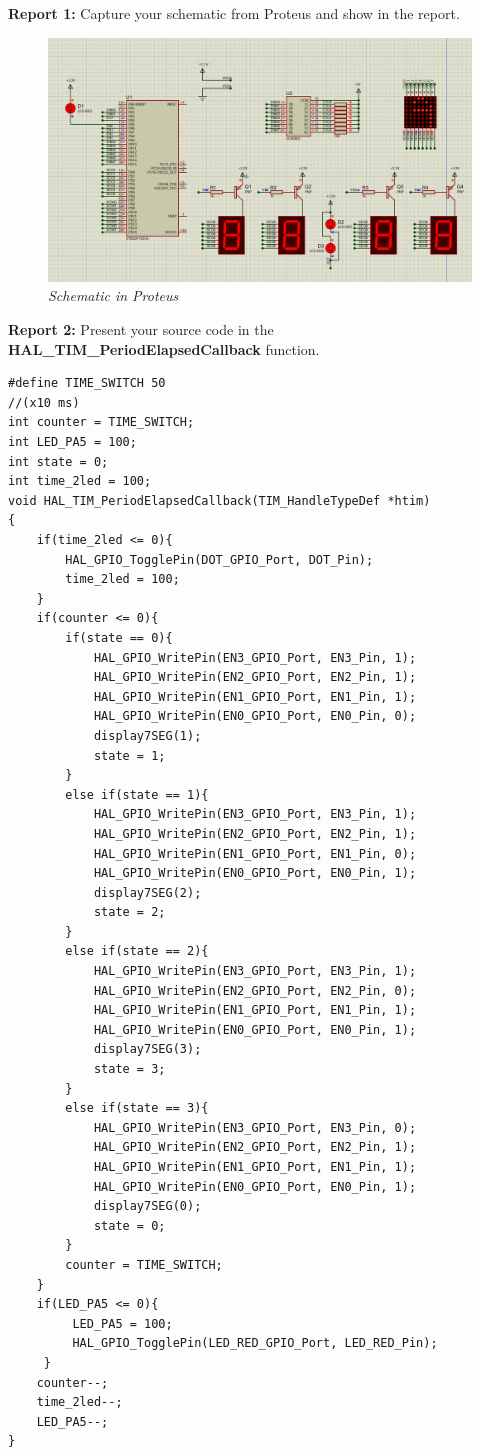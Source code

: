 \documentclass[twoside, final]{hcmut_report}
\begin{document}
\textbf{Report 1: } Capture your schematic from Proteus and show in the report.

\begin{figure}[!htp]
    \centering
    \includegraphics[width=5.5in]{graphics/f1.png}
    \caption{\textit{Schematic in Proteus}}
\end{figure}

\pagebreak

\textbf{Report 2: } Present your source code in the \textbf{HAL\_TIM\_PeriodElapsedCallback} function.\\

\begin{lstlisting}[caption=The \textbf{HAL\_TIM\_PeriodElapsedCallback} function]
#define TIME_SWITCH 50
//(x10 ms)
int counter = TIME_SWITCH;
int LED_PA5 = 100;
int state = 0;
int time_2led = 100;
void HAL_TIM_PeriodElapsedCallback(TIM_HandleTypeDef *htim)
{
	if(time_2led <= 0){
		HAL_GPIO_TogglePin(DOT_GPIO_Port, DOT_Pin);
		time_2led = 100;
	}
	if(counter <= 0){
		if(state == 0){
			HAL_GPIO_WritePin(EN3_GPIO_Port, EN3_Pin, 1);
			HAL_GPIO_WritePin(EN2_GPIO_Port, EN2_Pin, 1);
			HAL_GPIO_WritePin(EN1_GPIO_Port, EN1_Pin, 1);
			HAL_GPIO_WritePin(EN0_GPIO_Port, EN0_Pin, 0);
			display7SEG(1);
			state = 1;
		}
		else if(state == 1){
			HAL_GPIO_WritePin(EN3_GPIO_Port, EN3_Pin, 1);
			HAL_GPIO_WritePin(EN2_GPIO_Port, EN2_Pin, 1);
			HAL_GPIO_WritePin(EN1_GPIO_Port, EN1_Pin, 0);
			HAL_GPIO_WritePin(EN0_GPIO_Port, EN0_Pin, 1);
			display7SEG(2);
			state = 2;
		}
		else if(state == 2){
			HAL_GPIO_WritePin(EN3_GPIO_Port, EN3_Pin, 1);
			HAL_GPIO_WritePin(EN2_GPIO_Port, EN2_Pin, 0);
			HAL_GPIO_WritePin(EN1_GPIO_Port, EN1_Pin, 1);
			HAL_GPIO_WritePin(EN0_GPIO_Port, EN0_Pin, 1);
			display7SEG(3);
			state = 3;
		}
		else if(state == 3){
			HAL_GPIO_WritePin(EN3_GPIO_Port, EN3_Pin, 0);
			HAL_GPIO_WritePin(EN2_GPIO_Port, EN2_Pin, 1);
			HAL_GPIO_WritePin(EN1_GPIO_Port, EN1_Pin, 1);
			HAL_GPIO_WritePin(EN0_GPIO_Port, EN0_Pin, 1);
			display7SEG(0);
			state = 0;
		}
		counter = TIME_SWITCH;
	}
	if(LED_PA5 <= 0){
		 LED_PA5 = 100;
		 HAL_GPIO_TogglePin(LED_RED_GPIO_Port, LED_RED_Pin);
	 }
	counter--;
	time_2led--;
	LED_PA5--;
}
\end{lstlisting}
\end{document}
